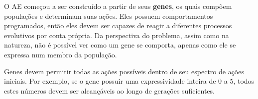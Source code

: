 O AE começou a ser construído a partir de seus \textbf{genes}, os quais compõem populações e determinam suas ações. Eles possuem comportamentos programados, então eles devem ser capazes de reagir a diferentes processos evolutivos por conta própria. Da perspectiva do problema, assim como na natureza, não é possível ver como um gene se comporta, apenas como ele se expressa num membro da população.

Genes devem permitir todas as ações possíveis dentro de seu espectro de ações iniciais. Por exemplo, se o gene possuir uma expressividade inteira de 0 a 5, todos estes números devem ser alcançáveis ao longo de gerações suficientes.